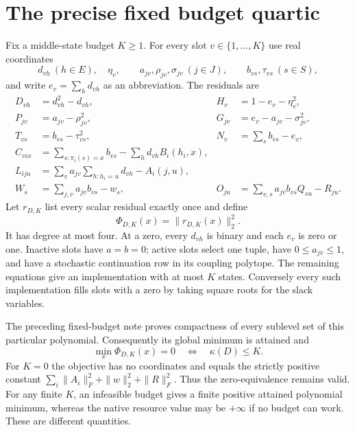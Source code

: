 \documentclass[11pt]{article}
\theoremstyle{remark}
\begin{document}
\section{The precise fixed budget quartic}\label{sec:quartic}
Fix a middle-state budget $K\ge1$. For every slot $v\in\{1,\ldots,K\}$ use real coordinates
\[
 d_{vh}\ (h\in E),\quad\eta_v,\qquad
 a_{jv},\rho_{jv},\sigma_{jv}\ (j\in J),\qquad
 b_{vs},\tau_{vs}\ (s\in S),
\]
and write $e_v=\sum_hd_{vh}$ as an abbreviation. The residuals are
\begin{align}
 D_{vh}&=d_{vh}^2-d_{vh},&H_v&=1-e_v-\eta_v^2,\label{eq:struct1}\\
 P_{jv}&=a_{jv}-\rho_{jv}^2,&G_{jv}&=e_v-a_{jv}-\sigma_{jv}^2,\label{eq:struct2}\\
 T_{vs}&=b_{vs}-\tau_{vs}^2,&N_v&=\sum_sb_{vs}-e_v,\label{eq:struct3}\\
 C_{vix}&=\sum_{s:\pi_i(s)=x}b_{vs}-\sum_hd_{vh}B_i(h_i,x),\label{eq:local-row-residual}\\
 L_{iju}&=\sum_va_{jv}\sum_{h:h_i=u}d_{vh}-A_i(j,u),\label{eq:local-root-residual}\\
 W_s&=\sum_{j,v}a_{jv}b_{vs}-w_s,&
 O_{ju}&=\sum_{v,s}a_{jv}b_{vs}Q_{su}-R_{ju}.\label{eq:global-residual}
\end{align}
Let $r_{D,K}$ list every scalar residual exactly once and define
\begin{equation}\label{eq:loss}
 \Phi_{D,K}(x)=\|r_{D,K}(x)\|_2^2.
\end{equation}
It has degree at most four. At a zero, every $d_{vh}$ is binary and each $e_v$ is zero or one. Inactive slots have $a=b=0$; active slots select one tuple, have $0\le a_{jv}\le1$, and have a stochastic continuation row in its coupling polytope. The remaining equations give an implementation with at most $K$ states. Conversely every such implementation fills slots with a zero by taking square roots for the slack variables.

The preceding fixed-budget note proves compactness of every sublevel set of this particular polynomial. Consequently its global minimum is attained and
\begin{equation}\label{eq:zero-equivalence}
 \min_x\Phi_{D,K}(x)=0\quad\Longleftrightarrow\quad\kappa(D)\le K.
\end{equation}
For $K=0$ the objective has no coordinates and equals the strictly positive constant $\sum_i\|A_i\|_F^2+\|w\|_2^2+\|R\|_F^2$. Thus the zero-equivalence remains valid. For any finite $K$, an infeasible budget gives a finite positive attained polynomial minimum, whereas the native resource value may be $+\infty$ if no budget can work. These are different quantities.
\end{document}
